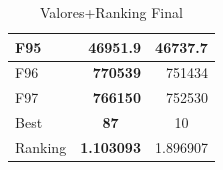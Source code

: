 \begin{table}[]
\begin{tabular}{lrr|}
\multicolumn{1}{|l|}{\cellcolor[HTML]{FCE6AB}F95} & \multicolumn{1}{r|}{\cellcolor[HTML]{D3FFB6}\textbf{46951.9}} & 46737.7                                                   \\ \hline
\multicolumn{1}{|l|}{\cellcolor[HTML]{FCE6AB}F96} & \multicolumn{1}{r|}{\cellcolor[HTML]{D3FFB6}\textbf{770539}}  & 751434                                                    \\ \hline
\multicolumn{1}{|l|}{\cellcolor[HTML]{FCE6AB}F97} & \multicolumn{1}{r|}{\cellcolor[HTML]{D3FFB6}\textbf{766150}}  & 752530                                                    \\ \hline
\multicolumn{1}{|l}{\cellcolor[HTML]{FFFFC7}Best} & \multicolumn{1}{c}{\cellcolor[HTML]{D3FFB6}\textbf{87}}       & \multicolumn{1}{c|}{10}                                   \\
\multicolumn{1}{|l}{Ranking}                      & \multicolumn{1}{c}{\cellcolor[HTML]{D3FFB6}\textbf{1.103093}} & \multicolumn{1}{c|}{1.896907}                             \\ \hline
\end{tabular}
\caption{Valores+Ranking Final}
\end{table}

